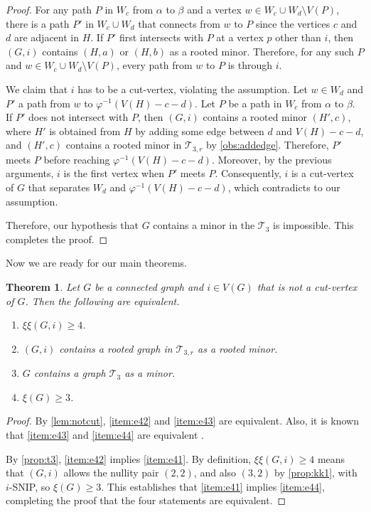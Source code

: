 \documentclass{article}
\newtheorem{theorem}{Theorem}[section]
\theoremstyle{definition}
\newcommand{\excise}{\xi\xi}
\newcommand{\ttf}{\mathcal{T}_3}
\newcommand{\ttfr}{\mathcal{T}_{3,r}}
\begin{document}
\begin{proof}
For any path $P$ in $W_c$ from $\alpha$ to $\beta$ and a vertex $w\in W_c\cup W_d\setminus V(P)$, there is a path $P'$ in $W_c\cup W_d$ that connects from $w$ to $P$ since the vertices $c$ and $d$ are adjacent in $H$.  If $P'$ first intersects with $P$ at a vertex $p$ other than $i$, then $(G,i)$ contains $(H,a)$ or $(H,b)$ as a rooted minor.  Therefore, for any such $P$ and $w\in W_c\cup W_d\setminus V(P)$, every path from $w$ to $P$ is through $i$.  

We claim that $i$ has to be a cut-vertex, violating the assumption.  Let $w\in W_d$ and $P'$ a path from $w$ to $\varphi^{-1}(V(H) - c - d)$.  Let $P$ be a path in $W_c$ from $\alpha$ to $\beta$.  If $P'$ does not intersect with $P$, then $(G,i)$ contains a rooted minor $(H',c)$, where $H'$ is obtained from $H$ by adding some edge between $d$ and $V(H) - c - d$, and $(H',c)$ contains a rooted minor in $\ttfr$ by \cref{obs:addedge}.  Therefore, $P'$ meets $P$ before reaching $\varphi^{-1}(V(H) - c - d)$.  Moreover, by the previous arguments, $i$ is the first vertex when $P'$ meets $P$.  Consequently, $i$ is a cut-vertex of $G$ that separates $W_d$ and $\varphi^{-1}(V(H) - c - d)$, which contradicts to our assumption.  

Therefore, our hypothesis that $G$ contains a minor in the $\ttf$ is impossible.  This completes the proof.
\end{proof}

Now we are ready for our main theorems.  

\begin{theorem}
\label{thm:e4}
Let $G$ be a connected graph and $i\in V(G)$ that is not a cut-vertex of $G$.  Then the following are equivalent.
\begin{enumerate}[label={{\rm(\alph*)}}]
\item $\excise(G,i) \geq 4$. \label{item:e41}
\item $(G,i)$ contains a rooted graph in $\ttfr$ as a rooted minor. \label{item:e42}
\item $G$ contains a graph $\ttf$ as a minor. \label{item:e43}
\item $\xi(G) \geq 3$. \label{item:e44} 
\end{enumerate}
\end{theorem}
\begin{proof}
By \cref{lem:notcut}, \ref{item:e42} and \ref{item:e43} are equivalent.  Also, it is known that \ref{item:e43} and \ref{item:e44} are equivalent \cite{HvdH07}.

By \cref{prop:t3}, \ref{item:e42} implies \ref{item:e41}.  By definition, $\excise(G,i) \ge 4$ means that $(G,i)$ allows the nullity pair $(2,2)$, and also $(3,2)$ by \cref{prop:kk1}, with $i$-SNIP, so $\xi(G) \geq 3$.  This establishes that \ref{item:e41} implies \ref{item:e44}, completing the proof that the four statements are equivalent.
\end{proof}
\end{document}
